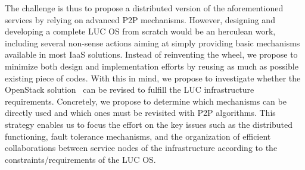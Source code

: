 

The challenge is thus to propose a distributed version of the
aforementioned services by relying on advanced P2P mechanisms.
However, designing and developing a complete LUC OS from scratch would
be an herculean work, including several non-sense actions aiming at
simply providing basic mechanisms available in most IaaS solutions.
Instead of reinventing the wheel, we propose to minimize both design
and implementation efforts by reusing as much as possible existing
piece of codes. With this in mind, we propose to investigate whether
the OpenStack solution~\cite{openstack} can be revised to fulfill
the LUC infrastructure requirements. Concretely, we propose to
determine which mechanisms can be directly used and which ones must be
revisited with P2P algorithms. This strategy enables us to focus the
effort on the key issues such as the distributed functioning, fault
tolerance mechanisms, and the organization of efficient collaborations
between service nodes of the infrastructure according to the
constraints/requirements of the LUC OS.





